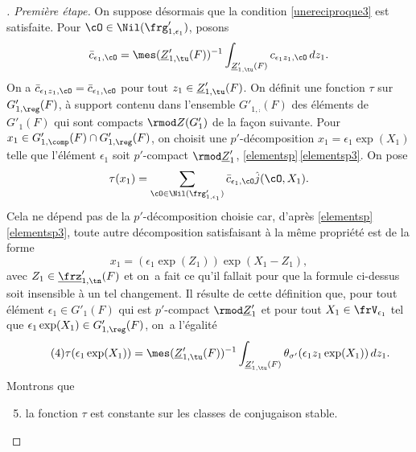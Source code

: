 \begin{proof}[\proofname. Première étape]
On suppose désormais que la condition \eqref{unereciproque3} est satisfaite. Pour $\cO\in \Nil(\frg'_{1,\epsilon_{1}})$, posons
\[
\bar{c}_{\epsilon_{1},\cO}=\mes(\underline{Z}'_{1,\tu}(F))^{-1}\int_{\underline{Z}'_{1,\tu}(F)}c_{\epsilon_{1}z_{1},\cO}\,dz_{1}.
\]
On a $\bar{c}_{\epsilon_{1}z_{1},\cO}=\bar{c}_{\epsilon_{1},\cO}$ pour tout $z_{1}\in \underline{Z}'_{1,\tu}(F)$. On définit une fonction $\tau$ sur $G'_{1,\reg}(F)$, à support contenu dans l'ensemble $G'_{1,\comp}(F)$ des éléments de $G'_{1}(F)$ qui sont compacts $\rmod Z(G'_{1})$ de la façon suivante. Pour $x_{1}\in G'_{1,\comp}(F)\cap G'_{1,\reg}(F)$, on choisit une $p'$-décomposition $x_{1}=\epsilon_{1}\exp(X_{1})$ telle que l'élément $\epsilon_{1}$ soit $p'$-compact $\rmod \underline{Z}'_{1}$, \cf \ref{elementsp}\,\eqref{elementsp3}. On pose
\[
\tau(x_{1})=\sum_{\cO\in \Nil(\frg'_{1,\epsilon_{1}})}\bar{c}_{\epsilon_{1},\cO}\hat{j}(\cO,X_{1}).
\]
Cela ne dépend pas de la $p'$-décomposition choisie car, d'après \ref{elementsp}\,\eqref{elementsp3}, toute autre décomposition satisfaisant à la même propriété est de la forme
\[
x_{1}=(\epsilon_{1}\exp(Z_{1}))\exp(X_{1}-Z_{1}),
\]
avec $Z_{1}\in \underline{\frz}'_{1,\tn}(F)$ et on~a fait ce qu'il fallait pour que la formule ci-dessus soit insensible à un tel changement. Il résulte de cette définition que, pour tout élément $\epsilon_{1}\in G'_{1}(F)$ qui est $p'$-compact $\rmod \underline{Z}'_{1}$ et pour tout $X_{1}\in \frV_{\epsilon_{1}}$ tel que $\epsilon_{1}\exp(X_{1})\in G'_{1,\reg}(F)$, on~a l'égalité
\begin{equation}\tag{4}\label{unereciproque4}
\tau(\epsilon_{1}\exp(X_{1}))=\mes(\underline{Z}'_{1,\tu}(F))^{-1}\int_{\underline{Z}'_{1,\tu}(F)}\theta_{\sigma'}(\epsilon_{1}z_{1}\exp(X_{1}))\,dz_{1}.
\end{equation}
Montrons que
\begin{enumerate}\setcounter{enumi}{4}
\item\label{unereciproque5}
la fonction $\tau$ est constante sur les classes de conjugaison stable.
\end{enumerate}


\end{proof}
